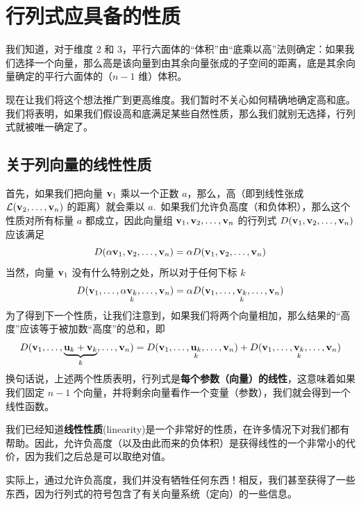 \section{行列式应具备的性质}\label{sec:03-02}

我们知道，对于维度 2 和 3，平行六面体的“体积”由“底乘以高”法则确定：如果我们选择一个向量，那么高是该向量到由其余向量张成的子空间的距离，底是其余向量确定的平行六面体的（$n-1$ 维）体积。

现在让我们将这个想法推广到更高维度。我们暂时不关心如何精确地确定高和底。我们将表明，如果我们假设高和底满足某些自然性质，那么我们就别无选择，行列式就被唯一确定了。

\subsection{关于列向量的线性性质}\label{sec:03-02-01}

首先，如果我们把向量 $\mathbf{v}_1$ 乘以一个正数 $a$，那么，高（即到线性张成 $\mathcal{L}(\mathbf{v}_2, \dots, \mathbf{v}_n)$ 的距离）就会乘以 $a$.~如果我们允许负高度（和负体积），那么这个性质对所有标量 $a$ 都成立，因此向量组 $\mathbf{v}_1, \mathbf{v}_2, \dots, \mathbf{v}_n$ 的行列式 $D(\mathbf{v}_1, \mathbf{v}_2, \dots, \mathbf{v}_n)$ 应该满足
$$
D(\alpha \mathbf{v}_1, \mathbf{v}_2, \dots, \mathbf{v}_n) = \alpha D(\mathbf{v}_1, \mathbf{v}_2, \dots, \mathbf{v}_n)
$$
当然，向量 $\mathbf{v}_1$ 没有什么特别之处，所以对于任何下标 $k$
\begin{equation}\label{eq:03-02-01}
D(\mathbf{v}_1, \dots, \alpha \underset{k}{\mathbf{v}_k}, \dots, \mathbf{v}_n) = \alpha D(\mathbf{v}_1, \dots, \underset{k}{\mathbf{v}_k}, \dots, \mathbf{v}_n)
\end{equation}
为了得到下一个性质，让我们注意到，如果我们将两个向量相加，那么结果的“高度”应该等于被加数“高度”的总和，即
\begin{equation}\label{eq:03-02-02}
D(\mathbf{v}_1, \dots, \underset{k}{\underbrace{\mathbf{u}_k + \mathbf{v}_k}}, \dots, \mathbf{v}_n) =\\
D(\mathbf{v}_1, \dots, \underset{k}{\mathbf{u}_k}, \dots, \mathbf{v}_n) + D(\mathbf{v}_1, \dots, \underset{k}{\mathbf{v}_k}, \dots, \mathbf{v}_n)
\end{equation}
换句话说，上述两个性质表明，行列式是\textbf{每个参数（向量）的线性}，这意味着如果我们固定 $n-1$ 个向量，并将剩余向量看作一个变量（参数），我们就会得到一个线性函数。

\begin{remark*}
我们已经知道\textbf{线性性质}(linearity)是一个非常好的性质，在许多情况下对我们都有帮助。因此，允许负高度（以及由此而来的负体积）是获得线性的一个非常小的代价，因为我们之后总是可以取绝对值。
\end{remark*}

实际上，通过允许负高度，我们并没有牺牲任何东西！相反，我们甚至获得了一些东西，因为行列式的符号包含了有关向量系统（定向）的一些信息。


